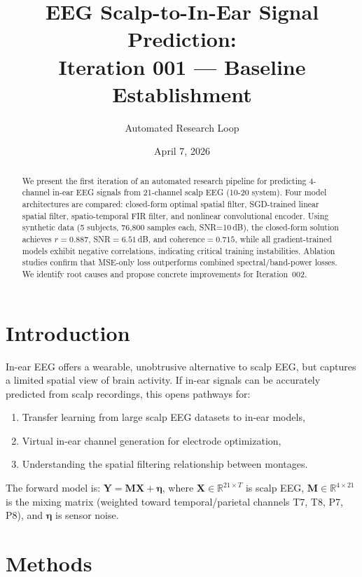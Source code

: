 \documentclass[11pt,a4paper]{article}
\title{EEG Scalp-to-In-Ear Signal Prediction:\\
  Iteration 001 --- Baseline Establishment}
\author{Automated Research Loop}
\date{April 7, 2026}
\begin{document}
\maketitle

\begin{abstract}
We present the first iteration of an automated research pipeline for predicting
4-channel in-ear EEG signals from 21-channel scalp EEG (10-20 system). Four
model architectures are compared: closed-form optimal spatial filter, SGD-trained
linear spatial filter, spatio-temporal FIR filter, and nonlinear convolutional
encoder. Using synthetic data (5 subjects, 76,800 samples each, SNR=10\,dB),
the closed-form solution achieves $r=0.887$, SNR$=6.51$\,dB, and coherence$=0.715$,
while all gradient-trained models exhibit negative correlations, indicating
critical training instabilities. Ablation studies confirm that MSE-only loss
outperforms combined spectral/band-power losses. We identify root causes and
propose concrete improvements for Iteration~002.
\end{abstract}

\section{Introduction}

In-ear EEG offers a wearable, unobtrusive alternative to scalp EEG, but
captures a limited spatial view of brain activity. If in-ear signals can be
accurately predicted from scalp recordings, this opens pathways for:
\begin{enumerate}
  \item Transfer learning from large scalp EEG datasets to in-ear models,
  \item Virtual in-ear channel generation for electrode optimization,
  \item Understanding the spatial filtering relationship between montages.
\end{enumerate}

The forward model is: $\mathbf{Y} = \mathbf{M}\mathbf{X} + \boldsymbol{\eta}$,
where $\mathbf{X} \in \mathbb{R}^{21 \times T}$ is scalp EEG,
$\mathbf{M} \in \mathbb{R}^{4 \times 21}$ is the mixing matrix (weighted toward
temporal/parietal channels T7, T8, P7, P8), and $\boldsymbol{\eta}$ is sensor noise.

\section{Methods}
\end{document}
